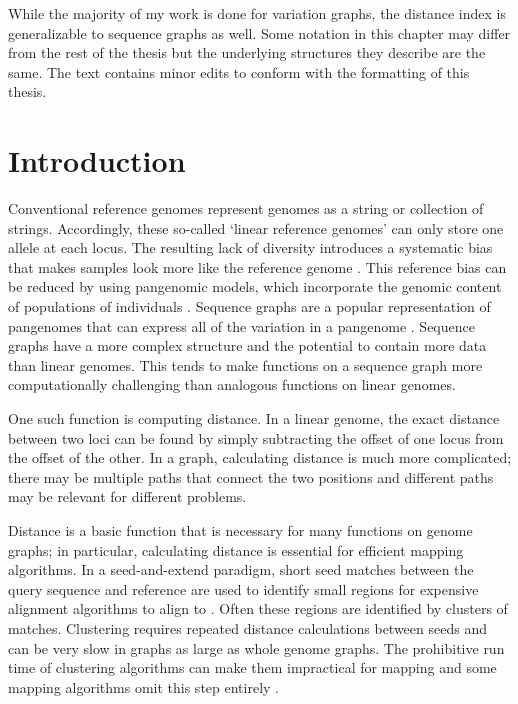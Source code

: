 \documentclass[11pt]{ucscthesis}
\begin{document}
While the majority of my work is done for variation graphs, the distance index is generalizable to sequence graphs as well.
Some notation in this chapter may differ from the rest of the thesis but the underlying structures they describe are the same.
The text contains minor edits to conform with the formatting of this thesis.

\newpage

\section{Introduction}
Conventional reference genomes represent genomes as a string or collection of strings.
Accordingly, these so-called ‘linear reference genomes’ can only store one allele at each locus.
The resulting lack of diversity introduces a systematic bias that makes samples look more like the reference genome \cite{zook_integrating_2014}.
This reference bias can be reduced by using pangenomic models, which incorporate the genomic content of populations of individuals \cite{noauthor_computational_2016}.
Sequence graphs are a popular representation of pangenomes that can express all of the variation in a pangenome \cite{paten_genome_2017}. 
Sequence graphs have a more complex structure and the potential to contain more data than linear genomes.
This tends to make functions on a sequence graph more computationally challenging than analogous functions on linear genomes.

One such function is computing distance.
In a linear genome, the exact distance between two loci can be found by simply subtracting the offset of one locus from the offset of the other.
In a graph, calculating distance is much more complicated; there may be multiple paths that connect the two positions and different paths may be relevant for different problems.

Distance is a basic function that is necessary for many functions on genome graphs; in particular, calculating distance is essential for efficient mapping algorithms.
In a seed-and-extend paradigm, short seed matches between the query sequence and reference are used to identify small regions for expensive alignment algorithms to align to \cite{schneeberger_simultaneous_2009,li_minimap_2016,rakocevic_fast_2019,garrison_vg_2018,vaddadi_read_2019,rautiainen_bit-parallel_2019}. 
Often these regions are identified by clusters of matches. 
Clustering requires repeated distance calculations between seeds and can be very slow in graphs as large as whole genome graphs. 
The prohibitive run time of clustering algorithms can make them impractical for mapping and some mapping algorithms omit this step entirely \cite{rautiainen_bit-parallel_2019}.
\end{document}
